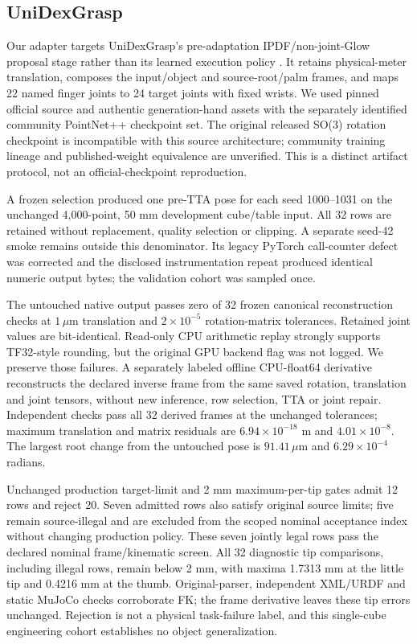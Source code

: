 \documentclass[10pt,letterpaper]{article}
\begin{document}
\subsection{UniDexGrasp}
Our adapter targets UniDexGrasp's pre-adaptation IPDF/non-joint-Glow proposal
stage rather than its learned execution policy \cite{unidex}. It retains
physical-meter translation, composes the input/object and source-root/palm
frames, and maps 22 named finger joints to 24 target joints with fixed wrists.
We used pinned official source and authentic generation-hand assets with the
separately identified community PointNet++ checkpoint set. The original released
SO(3) rotation checkpoint is incompatible with this source architecture;
community training lineage and published-weight equivalence are unverified.
This is a distinct artifact protocol, not an official-checkpoint reproduction.

A frozen selection produced one pre-TTA pose for each seed 1000--1031 on the
unchanged 4,000-point, 50 mm development cube/table input. All 32 rows are
retained without replacement, quality selection or clipping. A separate seed-42
smoke remains outside this denominator. Its legacy PyTorch call-counter defect
was corrected and the disclosed instrumentation repeat produced identical
numeric output bytes; the validation cohort was sampled once.

The untouched native output passes zero of 32 frozen canonical reconstruction
checks at $1\,\mu\mathrm{m}$ translation and $2\times10^{-5}$ rotation-matrix
tolerances. Retained joint values are bit-identical. Read-only CPU arithmetic
replay strongly supports TF32-style rounding, but the original GPU backend flag
was not logged. We preserve those failures. A separately labeled offline
CPU-float64 derivative reconstructs the declared inverse frame from the same
saved rotation, translation and joint tensors, without new inference, row
selection, TTA or joint repair. Independent checks pass all 32 derived frames
at the unchanged tolerances; maximum translation and matrix residuals are
$6.94\times10^{-18}$ m and $4.01\times10^{-8}$. The largest root change from
the untouched pose is $91.41\,\mu\mathrm{m}$ and $6.29\times10^{-4}$ radians.

Unchanged production target-limit and 2 mm maximum-per-tip gates admit 12 rows
and reject 20. Seven admitted rows also satisfy original source limits; five
remain source-illegal and are excluded from the scoped nominal acceptance
index without changing production policy. These seven jointly legal rows pass
the declared nominal frame/kinematic screen. All 32 diagnostic tip comparisons,
including illegal rows, remain below 2 mm, with maxima 1.7313 mm at the little
tip and 0.4216 mm at the thumb. Original-parser, independent XML/URDF and static
MuJoCo checks corroborate FK; the frame derivative leaves these tip errors
unchanged. Rejection is not a physical task-failure label, and this single-cube
engineering cohort establishes no object generalization.
\end{document}
